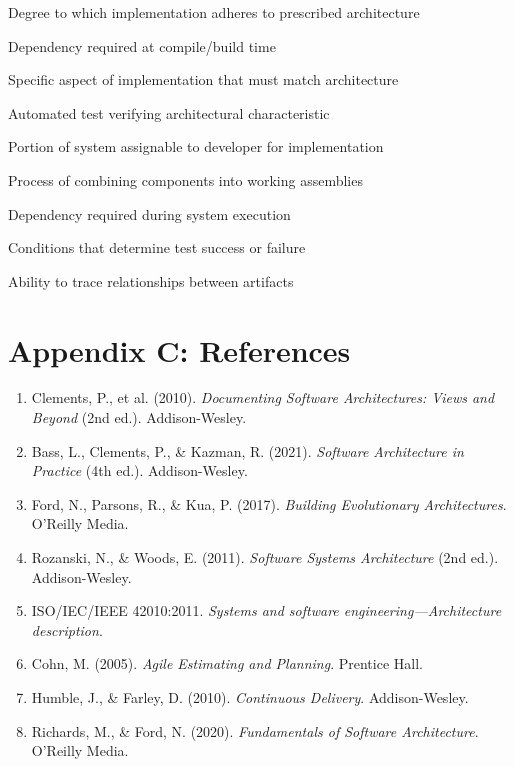\documentclass[11pt]{article}
\begin{document}
\begin{description}[leftmargin=3cm, style=nextline]
    \item[Architecture Conformance] Degree to which implementation adheres to prescribed architecture
    \item[Build Dependency] Dependency required at compile/build time
    \item[Conformance Point] Specific aspect of implementation that must match architecture
    \item[Fitness Function] Automated test verifying architectural characteristic
    \item[Implementation Unit] Portion of system assignable to developer for implementation
    \item[Integration] Process of combining components into working assemblies
    \item[Runtime Dependency] Dependency required during system execution
    \item[Test Criteria] Conditions that determine test success or failure
    \item[Traceability] Ability to trace relationships between artifacts
\end{description}

\section{Appendix C: References}

\begin{enumerate}
    \item Clements, P., et al. (2010). \textit{Documenting Software Architectures: Views and Beyond} (2nd ed.). Addison-Wesley.
    
    \item Bass, L., Clements, P., \& Kazman, R. (2021). \textit{Software Architecture in Practice} (4th ed.). Addison-Wesley.
    
    \item Ford, N., Parsons, R., \& Kua, P. (2017). \textit{Building Evolutionary Architectures}. O'Reilly Media.
    
    \item Rozanski, N., \& Woods, E. (2011). \textit{Software Systems Architecture} (2nd ed.). Addison-Wesley.
    
    \item ISO/IEC/IEEE 42010:2011. \textit{Systems and software engineering---Architecture description}.
    
    \item Cohn, M. (2005). \textit{Agile Estimating and Planning}. Prentice Hall.
    
    \item Humble, J., \& Farley, D. (2010). \textit{Continuous Delivery}. Addison-Wesley.
    
    \item Richards, M., \& Ford, N. (2020). \textit{Fundamentals of Software Architecture}. O'Reilly Media.
\end{enumerate}
\end{document}
